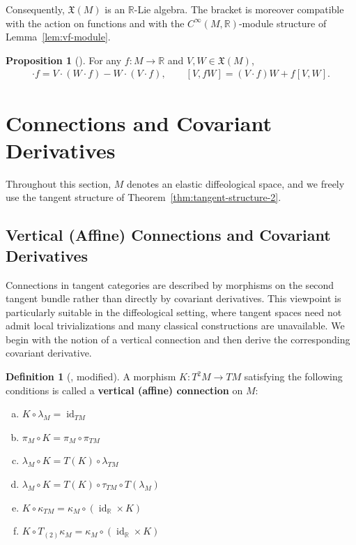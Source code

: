 \documentclass{amsart}
\newcommand{\R}{\mathbb{R}}
\DeclareMathOperator{\id}{id}
\theoremstyle{definition}
\newtheorem{defn}[thm]{Definition}
\newtheorem{prop}[thm]{Proposition}
\begin{document}
Consequently, $\mathfrak{X}(M)$ is an $\R$-Lie algebra. The bracket is
moreover compatible with the action on functions and with the
$C^\infty(M,\R)$-module structure of Lemma~\ref{lem:vf-module}.

\begin{prop}[{\cite[Propositions~2.25, 2.27]{AB}}]\label{prop:leibniz-bracket}
For any $f \colon M \to \R$ and $V, W \in \mathfrak{X}(M)$,
\begin{align*}
    [V, W] \cdot f = V \cdot (W \cdot f) - W \cdot (V \cdot f),
    \qquad
    [V, fW] = (V \cdot f)W + f[V, W].
\end{align*}
\end{prop}

\section{Connections and Covariant Derivatives}\label{sec:connections}

Throughout this section, $M$ denotes an elastic diffeological space, and we
freely use the tangent structure of Theorem~\ref{thm:tangent-structure-2}.

\subsection{Vertical (Affine) Connections and Covariant Derivatives}%
\label{subsec:vertical-cov}

Connections in tangent categories are described by morphisms on the second tangent bundle rather than directly by covariant derivatives. This viewpoint is particularly suitable in the diffeological setting, where tangent spaces need not admit local trivializations and many classical constructions are unavailable. We begin with the notion of a vertical connection and then derive the corresponding covariant derivative.


\begin{defn}[{\cite[Definitions~3.2, 3.3]{CC17}, modified}]\label{def:vertical-connection}
  A morphism $K \colon T^2M \to TM$ satisfying the following conditions
  is called a \textbf{vertical (affine) connection} on $M$:
  \begin{enumerate}[(a)]
    \item $K \circ \lambda_M = \id_{TM}$
    \item $\pi_M \circ K = \pi_M \circ \pi_{TM}$
    \item $\lambda_M \circ K = T(K) \circ \lambda_{TM}$
    \item $\lambda_M \circ K = T(K) \circ \tau_{TM} \circ T(\lambda_M)$
    \item $K \circ \kappa_{TM} = \kappa_M \circ (\id_{\R} \times K)$
    \item $K \circ T_{(2)}\kappa_M = \kappa_M \circ (\id_{\R} \times K)$
  \end{enumerate}
\end{defn}
\end{document}
